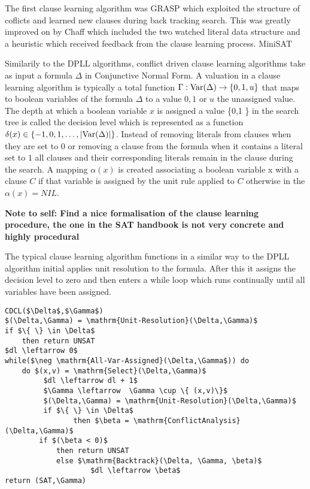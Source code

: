 The first clause learning algorithm was GRASP \cite{MS99,MS96} which exploited the structure of coflicts and learned new clauses during back tracking search. This was greatly improved on by Chaff \cite{LZ01} which included the two watched literal data structure and a heuristic which received feedback from the clause learning process. MiniSAT

Similarily to the DPLL algorithms, conflict driven clause learning algorithms take as input a formula $\Delta$ in Conjunctive Normal Form. 
A valuation in a clause learning algorithm is typically a total function $\Gamma : \mathrm{Var}(\Delta) \to \{0,1,u\}$ that maps to boolean variables of the formula $\Delta$ to a value $0,1$ or $u$ the unassigned value. The depth at which a boolean variable $x$ is assigned a value \{0,1 \} in the search tree is called the decision level which is represented as a function $\delta(x) \in \{-1,0,1, \ldots, |\mathrm{Var}(\Delta)| \} $. Instead of removing literals from clauses when they are set to $0$ or removing a clause from the formula when it contains a literal set to $1$ all clauses and their corresponding literals remain in the clause during the search. A mapping $\alpha(x)$ is created associating a boolean variable x with a clause $C$ if that variable is assigned by the unit rule applied to $C$ otherwise in the $\alpha(x) = NIL$.

\textbf{Note to self: Find a nice formalisation of the clause learning procedure, the one in the SAT handbook is not very concrete and highly procedural}



The typical clause learning algorithm functions in a similar way to the DPLL algorithm initial applies unit resolution to the formula. After this it assigns the decision level to zero and then enters a while loop which runs continually until all variables have been assigned.




\begin{lstlisting}[caption = Example CDCL Algorithm, mathescape]
CDCL($\Delta$,$\Gamma$)
$(\Delta,\Gamma) = \mathrm{Unit-Resolution}(\Delta,\Gamma)$
if $\{ \} \in \Delta$
	then return UNSAT
$dl \leftarrow 0$
while($\neg \mathrm{All-Var-Assigned}(\Delta,\Gamma$)) do
	do $(x,v) = \mathrm{Select}(\Delta,\Gamma)$
 	     $dl \leftarrow dl + 1$
 	     $\Gamma \leftarrow  \Gamma \cup \{ (x,v)\}$
	     $(\Delta,\Gamma) = \mathrm{Unit-Resolution}(\Delta,\Gamma)$
	     if $\{ \} \in \Delta$
              	then $\beta = \mathrm{ConflictAnalysis}(\Delta,\Gamma)$
		if $(\beta < 0)$
			then return UNSAT
			else $\mathrm{Backtrack}(\Delta, \Gamma, \beta)$
			        $dl \leftarrow \beta$
return (SAT,\Gamma)
\end{lstlisting}




